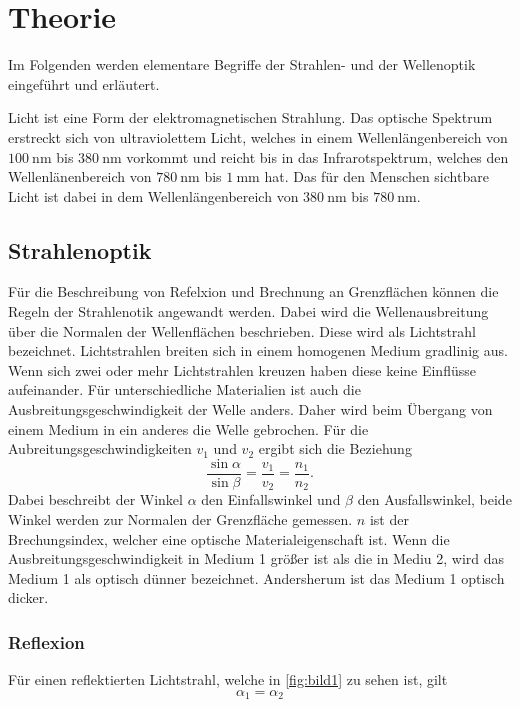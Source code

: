 \section{Theorie}
\label{sec:theorie}

Im Folgenden werden elementare Begriffe der Strahlen- und der Wellenoptik eingeführt und erläutert.

Licht ist eine Form der elektromagnetischen Strahlung. Das optische Spektrum erstreckt sich von ultraviolettem Licht, welches 
in einem Wellenlängenbereich von $\SI{100}{\nano\meter}$ bis $\SI{380}{\nano\meter}$ vorkommt und reicht bis in das Infrarotspektrum, welches 
den Wellenlänenbereich von $\SI{780}{\nano\meter}$ bis $\SI{1}{\milli\meter}$ hat. Das für den Menschen sichtbare Licht ist dabei in dem 
Wellenlängenbereich von $\SI{380}{\nano\meter}$ bis $\SI{780}{\nano\meter}$.

\subsection{Strahlenoptik}
\label{sec:Strahlenoptik}
 
Für die Beschreibung von Refelxion und Brechnung an Grenzflächen können die Regeln der Strahlenotik angewandt werden.
Dabei wird die Wellenausbreitung über die Normalen der Wellenflächen beschrieben. Diese wird als Lichtstrahl bezeichnet.
Lichtstrahlen breiten sich in einem homogenen Medium gradlinig aus. Wenn sich zwei oder mehr Lichtstrahlen kreuzen haben diese
keine Einflüsse aufeinander.
Für unterschiedliche Materialien ist auch die Ausbreitungsgeschwindigkeit der Welle anders. Daher wird beim Übergang von einem
Medium in ein anderes die Welle gebrochen. Für die Aubreitungsgeschwindigkeiten $v_1$ und $v_2$ ergibt sich die Beziehung
\begin{equation}
    \frac{\sin \alpha}{\sin \beta} =\frac{v_1}{v_2} = \frac{n_1}{n_2}.
    \label{eqn:bez}
\end{equation}
Dabei beschreibt der Winkel $\alpha$ den Einfallswinkel und $\beta$ den Ausfallswinkel, beide Winkel werden  zur Normalen der Grenzfläche gemessen. 
$n$ ist der Brechungsindex, welcher eine optische Materialeigenschaft ist.
Wenn die Ausbreitungsgeschwindigkeit in Medium 1 größer ist als die in Mediu  2, wird das Medium 1 als optisch dünner 
bezeichnet. Andersherum ist das Medium 1 optisch dicker.

\subsubsection{Reflexion}
\label{sec:Reflexion}
Für einen reflektierten Lichtstrahl, welche in \autoref{fig:bild1} zu sehen ist, gilt
\begin{equation}
    \alpha_1 = \alpha_2
    \label{eqn:relex}
\end{equation}

